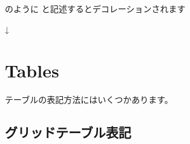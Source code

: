 \documentclass[letterpaper,10pt,dvipdfmx,openany,oneside]{sphinxmanual}
\begin{document}
のように \sphinxstylestrong{\textgreater{}\textgreater{}\textgreater{}} と記述するとデコレーションされます

↓

%
\begin{sphinxVerbatim}[commandchars=\\\{\}]
  
\end{sphinxVerbatim}


\section{Tables}
\label{\detokenize{1.chapter/basic_syntax:tables}}
テーブルの表記方法にはいくつかあります。


\subsection{グリッドテーブル表記}
\label{\detokenize{1.chapter/basic_syntax:id1}}
%
\end{document}
